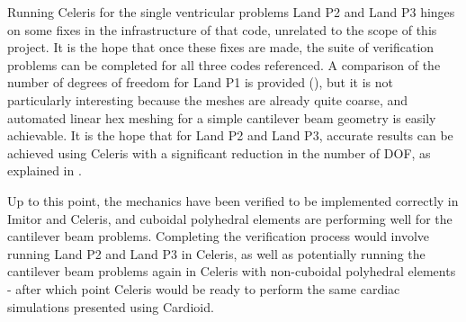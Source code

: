 Running Celeris for the single ventricular problems Land P2 and Land P3 hinges on some fixes in the infrastructure of that code, unrelated to the scope of this project. It is the hope that once these fixes are made, the suite of verification problems can be completed for all three codes referenced. A comparison of the number of degrees of freedom for Land P1 is provided (), but it is not particularly interesting because the meshes are already quite coarse, and automated linear hex meshing for a simple cantilever beam geometry is easily achievable. It is the hope that for Land P2 and Land P3, accurate results can be achieved using Celeris with a significant reduction in the number of DOF, as explained in .

Up to this point, the mechanics have been verified to be implemented correctly in Imitor and Celeris, and cuboidal polyhedral elements are performing well for the cantilever beam problems. Completing the verification process would involve running Land P2 and Land P3 in Celeris, as well as potentially running the cantilever beam problems again in Celeris with non-cuboidal polyhedral elements - after which point Celeris would be ready to perform the same cardiac simulations presented using Cardioid.

